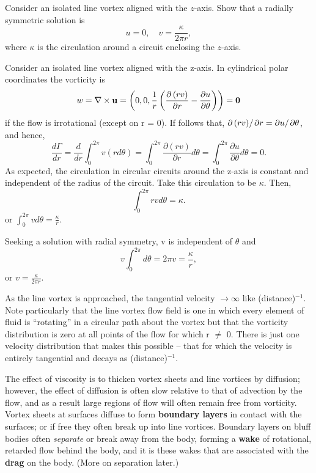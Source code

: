 \documentclass[10pt]{report}
\begin{document}
\begin{examplebox}
Consider an isolated line vortex aligned with the $z$-axis. Show that a
radially symmetric solution is
\[
u=0, \quad v = \frac{\kappa }{2\pi r},
\]
where $\kappa$ is the circulation around a circuit enclosing the $z$-axis.

\begin{examplesolution4}
	Consider an isolated line vortex aligned with the z-axis. In cylindrical
	polar coordinates the vorticity is
	\[
	w=\nabla \times {{\bf u}}=\left( {0,0,\frac{1}{r}\left( {\frac{\partial
	\left( {rv} \right)}{\partial r}-\frac{\partial u}{\partial \theta }}
	\right)} \right)={{\bf 0}}
	\]
	if the flow is irrotational (except on r = 0). If follows that, ${\partial
	\left( {rv} \right)} \mathord{\left/ {\vphantom {{\partial \left( {rv}
	\right)} {\partial r}}} \right. } {\partial
	r}={\partial u} \mathord{\left/ {\vphantom {{\partial u} {\partial \theta
	}}} \right. } {\partial \theta }$, and hence,
	\[
	\frac{d\Gamma }{dr}=\frac{d}{dr}\int_0^{2\pi } {v\left( {rd\theta
	} \right)} =\int_0^{2\pi } {\frac{\partial \left( {rv}
	\right)}{\partial r}d\theta =} \int_0^{2\pi } {\frac{\partial
	u}{\partial \theta }d\theta =} 0.
	\]
	As expected, the circulation in circular circuits around the z-axis is
	constant and independent of the radius of the circuit. Take this circulation
	to be $\kappa $. Then,
	\[
	\int_0^{2\pi } {rvd\theta } =\kappa .
	\]
	or $\int_0^{2\pi } {vd\theta } =\frac{\kappa }{r}$.

	Seeking a solution with radial symmetry, v is independent of $\theta $ and
	\[
	v\int_0^{2\pi } {d\theta } =2\pi v=\frac{\kappa }{r},
	\]
	or $v=\frac{\kappa }{2\pi r}$.

	As the line vortex is approached, the tangential velocity $\to \infty $
	like (distance)$^{-1}$. Note particularly that the line vortex flow field is
	one in which every element of fluid is ``rotating'' in a circular path about
	the vortex but that the vorticity distribution is zero at all points of the
	flow for which r $\ne $ 0. There is just one velocity distribution that
	makes this possible -- that for which the velocity is entirely tangential
	and decays as (distance)$^{-1}$.
\end{examplesolution4}
\end{examplebox}




The effect of viscosity is to thicken vortex sheets and line vortices by
diffusion; however, the effect of diffusion is often slow relative to that
of advection by the flow, and as a result large regions of flow will often
remain free from vorticity. Vortex sheets at surfaces diffuse to form
\textbf{boundary layers} in contact with the surfaces; or if free they often
break up into line vortices. Boundary layers on bluff bodies often
\textit{separate} or break away from the body, forming a \textbf{wake} of rotational,
retarded flow behind the body, and it is these wakes that are associated
with the \textbf{drag} on the body. (More on separation later.)
\end{document}
